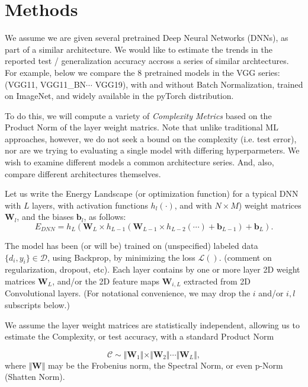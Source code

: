 \section{Methods}
\label{sxn:methods}

We assume we are given several pretrained Deep Neural Networks (DNNs), as part of a similar architecture.
We would like to estimate the trends in the reported test / generalization accuracy accross a series of similar archtectures.  
For example, below we compare the 8 pretrained models in the VGG series: (VGG11, VGG11\_BN$\cdots$ VGG19), with
and without Batch Normalization, trained on ImageNet, and widely available in the pyTorch distribution.

To do this, we will compute a variety of \emph{Complexity Metrics} based on the Product Norm of the layer weight matrics.
Note that unlike traditional ML approaches, however, we do not seek a bound on the complexity (i.e. test error), 
nor are we trying to evaluating a single model with differing hyperparmeters.  We wish to examine different models a 
common architecture series. And, also, compare different architectures themselves.  

Let us write the Energy Landscape (or optimization function) for a typical DNN with $L$ layers, with activation functions $h_{l}(\cdot)$, and with $N\times M$)  weight matrices $\mathbf{W}_{l}$, and the biases $\mathbf{b}_{l}$, as follows:
\begin{equation}
E_{DNN}=h_{L}(\mathbf{W}_{L}\times h_{L-1}(\mathbf{W}_{L-1}\times h_{L-2}(\cdots)+\mathbf{b}_{L-1})+\mathbf{b}_{L})  .
\label{eqn:dnn_energy}
\end{equation}

The model has been (or will be) trained on (unspecified) labeled data $\{d_{i},y_{i}\}\in\mathcal{D}$, 
using Backprop, by minimizing the loss $\mathcal{L}()$.  (comment on regularization, dropout, etc).  Each layer contains by one or more layer 2D weight matrices $\mathbf{W}_{L}$, and/or the 2D feature maps $\mathbf{W}_{i,L}$ extracted from 2D Convolutional layers.  (For notational convenience, we may drop the $i$ and/or $i,l$ subscripts below.)

We assume the layer weight matrices are statistically independent, allowing us to estimate the Complexity, or test accuracy, with a standard Product Norm

\begin{equation}
\mathcal{C}\sim\Vert\mathbf{W}_{1}\Vert\times\Vert\mathbf{W}_{2}\Vert\cdots\Vert\mathbf{W}_{L}\Vert ,
\end{equation}
where $\Vert\mathbf{W}\Vert$ may be the Frobenius norm, the Spectral Norm, or even p-Norm (Shatten Norm).

